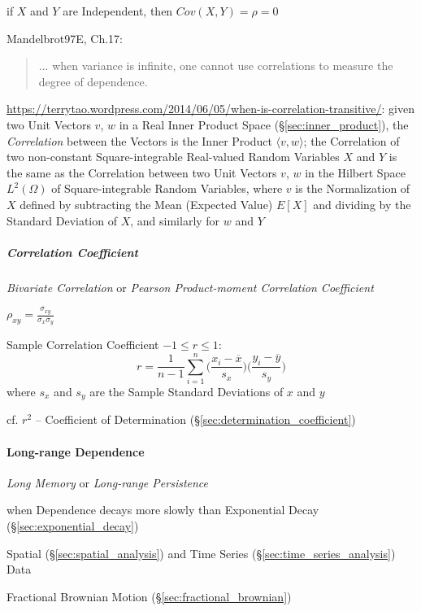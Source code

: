 if $X$ and $Y$ are Independent, then $Cov(X,Y) = \rho = 0$

Mandelbrot97E, Ch.17:
\begin{quote}
  ... when variance is infinite, one cannot use correlations to measure the
  degree of dependence.
\end{quote}

\url{https://terrytao.wordpress.com/2014/06/05/when-is-correlation-transitive/}:
given two Unit Vectors $v$, $w$ in a Real Inner Product Space
(\S\ref{sec:inner_product}), the \emph{Correlation} between the Vectors is the
Inner Product $\langle{v,w}\rangle$; the Correlation of two non-constant
Square-integrable Real-valued Random Variables $X$ and $Y$ is the same as the
Correlation between two Unit Vectors $v$, $w$ in the Hilbert Space $L^2(\Omega)$
of Square-integrable Random Variables, where $v$ is the Normalization of $X$
defined by subtracting the Mean (Expected Value) $E[X]$ and dividing by the
Standard Deviation of $X$, and similarly for $w$ and $Y$



\subparagraph{Correlation Coefficient}\label{sec:correlation_coefficient}\hfill

\emph{Bivariate Correlation} or \emph{Pearson Product-moment Correlation
  Coefficient}

$\rho_{xy} = \frac{\sigma_{xy}}{\sigma_x \sigma_y}$

Sample Correlation Coefficient $-1 \leq r \leq 1$:
\[
  r = \frac{1}{n-1} \sum_{i=1}^n
    \Big(\frac{x_i - \overline{x}}{s_x}\Big)
    \Big(\frac{y_i - \overline{y}}{s_y}\Big)
\]
where $s_x$ and $s_y$ are the Sample Standard Deviations of $x$ and $y$

\fist cf. $r^2$ -- Coefficient of
Determination (\S\ref{sec:determination_coefficient})



\paragraph{Long-range Dependence}\label{sec:long_range_dependence}\hfill

\emph{Long Memory} or \emph{Long-range Persistence}

when Dependence decays more slowly than Exponential Decay
(\S\ref{sec:exponential_decay})

Spatial (\S\ref{sec:spatial_analysis}) and Time Series
(\S\ref{sec:time_series_analysis}) Data

\fist Fractional Brownian Motion (\S\ref{sec:fractional_brownian})

